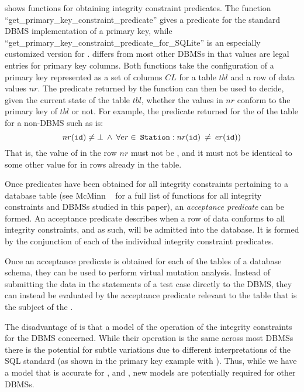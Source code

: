  shows functions for obtaining integrity constraint predicates. The function ``get\_primary\_key\_constraint\_predicate'' gives a predicate for the standard DBMS implementation of a primary key, while ``get\_primary\_key\_constraint\_predicate\_for\_SQLite'' is an especially customized version for \SQLite. \SQLite differs from most other DBMSs in that \NULL values are legal entries for primary key columns. Both 
functions take the configuration of a primary key represented as a set of columns $CL$ for a table $tbl$ and a row of data values $nr$. The predicate returned by the function can then be used to decide, given the current state of the table $tbl$, whether the values in $nr$ conform to the primary key of $tbl$ or not. For example, the predicate returned for the \PK of the  table for a non-\SQLite DBMS such as \Postgres is:
\[nr ({\normalfont{\texttt{id}}}) \neq \bot \: \wedge \: \forall er \in \: {\normalfont{\texttt{Station}}}: nr ({\normalfont{\texttt{id}}}) \: \neq \: er ({\normalfont{\texttt{id}}}))\]
That is, the value of  in the row $nr$ must not be \NULL, and it must not be identical to some other value for  in rows already in the table.



Once predicates have been obtained for all integrity constraints pertaining to a database table (see McMinn \etal~\cite{McMinn2015} for a full list of functions for all integrity constraints and DBMSs studied in this paper), an {\it acceptance predicate} can be formed. An acceptance predicate describes when a row of data conforms to all integrity constraints, and as such, will be admitted into the database. It is formed by the conjunction of each of the individual integrity constraint predicates.



Once an acceptance predicate is obtained for each of the tables of a database schema, they can be used to perform virtual mutation analysis. Instead of submitting the data in the \INSERT statements of a test case directly to the DBMS, they can instead be evaluated by the acceptance predicate relevant to the table that is the subject of the \INSERT. 

The disadvantage of \VMA is that a model of the operation of the integrity constraints for the DBMS concerned. While their operation is the same across most DBMSs there is the potential for subtle variations due to different interpretations of the SQL standard (as shown in the primary key example with \SQLite). Thus, while we have a model that is accurate for \HyperSQL, \Postgres and \SQLite, new models are potentially required for other DBMSs. 

